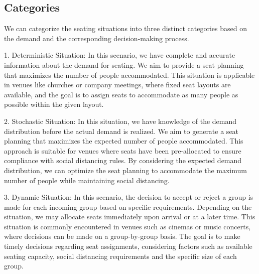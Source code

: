 \subsection{Categories}
We can categorize the seating situations into three distinct categories based on the demand and the corresponding decision-making process.


1. Deterministic Situation: In this scenario, we have complete and accurate information about the demand for seating. We aim to provide a seat planning that maximizes the number of people accommodated. This situation is applicable in venues like churches or company meetings, where fixed seat layouts are available, and the goal is to assign seats to accommodate as many people as possible within the given layout.

2. Stochastic Situation: In this situation, we have knowledge of the demand distribution before the actual demand is realized. We aim to generate a seat planning that maximizes the expected number of people accommodated. This approach is suitable for venues where seats have been pre-allocated to ensure compliance with social distancing rules. By considering the expected demand distribution, we can optimize the seat planning to accommodate the maximum number of people while maintaining social distancing.

3. Dynamic Situation: In this scenario, the decision to accept or reject a group is made for each incoming group based on specific requirements. Depending on the situation, we may allocate seats immediately upon arrival or at a later time. This situation is commonly encountered in venues such as cinemas or music concerts, where decisions can be made on a group-by-group basis. The goal is to make timely decisions regarding seat assignments, considering factors such as available seating capacity, social distancing requirements and the specific size of each group.

